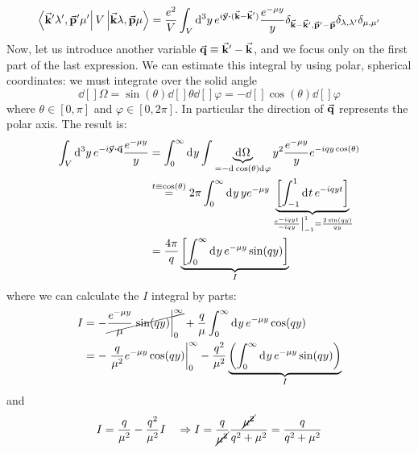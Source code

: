 \documentclass[../main/main.tex]{subfiles}
\begin{document}
\begin{itemize}
\begin{equation*}
    \bra{\va{k}'\lambda ', \va{p}' \mu '} V \ket{\va{k} \lambda , \va{p} \mu } =
    \frac{e^2}{V} \int_{V}^{} \dd[3]{y} e^{i \va{y} \vdot (\va{k}-\va{k}')} \frac{e^{-\mu y} }{y} \delta _{\va{k}-\va{k}',\va{p}'-\va{p}}  \delta _{\lambda , \lambda '} \delta _{\mu , \mu '}
\end{equation*}
Now, let us introduce another variable \( \va{q} \equiv \va{k}' - \va{k} \), and we focus only on the first part of the last expression. We can estimate this integral by using polar, spherical coordinates: we must integrate over the solid angle
\begin{equation*}
   \dd[]{\Omega } = \sin(\theta ) \dd[]{\theta }\dd[]{\varphi }  = - \dd[]{\cos(\theta ) \dd[]{\varphi } }
\end{equation*}
where \( \theta \in [0,\pi ] \) and \( \varphi \in [0,2 \pi ] \). In particular the direction of \( \va{q} \) represents the polar axis. The result is:
\begin{equation*}
\begin{split}
  \int_{V}^{} \dd[3]{y} e^{-i \va{y} \vdot \va{q}} \frac{e^{-\mu y} }{y} & = \int_{0}^{\infty } \dd[]{y} \int_{}^{} \underbrace{\dd[]{\Omega } }_{= - \dd[]{\cos(\theta ) } \dd[]{\varphi }  } y^2 \frac{e^{- \mu y} }{y} e^{-iqy \cos(\theta ) }         \\
  & \overset{t \equiv \cos(\theta ) }{=}
  2 \pi \int_{0}^{\infty } \dd[]{y}  y e^{-\mu y}
  \underbrace{\qty[\int_{-1}^{1} \dd[]{t} e^{-iqyt}   ] }_{ \eval{\frac{e^{-iqyt} }{-iqy}}_{-1}^1 = \frac{2\sin(qy) }{qy}  } \\
  &= \frac{4 \pi }{q}  \underbrace{ \qty[  \int_{0}^{\infty } \dd[]{y}  e^{- \mu y} \sin(qy)      ] }_{I}
\end{split}
\end{equation*}
where we can calculate the \( I \) integral by parts:
\begin{equation*}
\begin{split}
  I &= - \cancel{\frac{e^{- \mu y} }{\mu } \eval{\sin(qy) }_0^\infty}  +\frac{q}{\mu } \int_{0}^{\infty } \dd[]{y} e^{-\mu y} \cos(qy)  \\
  &= - \eval{\frac{q}{\mu ^2} e^{- \mu y} \cos(qy) }_0^\infty -\frac{q^2}{\mu ^2} \underbrace{\qty(\int_{0}^{\infty } \dd[]{y} e^{- \mu y}  \sin(qy)  )}_{I}
\end{split}
\end{equation*}
and
\begin{equation*}
  I = \frac{q}{\mu ^2} - \frac{q^2}{\mu ^2} I  \quad \Rightarrow I = \frac{q}{\cancel{\mu ^2} } \frac{\cancel{\mu ^2} }{q^2+\mu ^2} = \frac{q}{q^2+\mu ^2}

\end{equation*}
\end{itemize}
\end{document}
